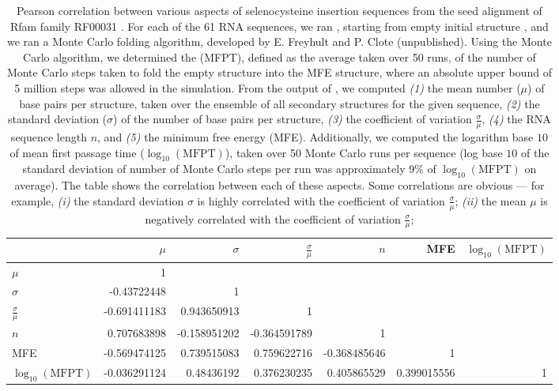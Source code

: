 \begin{landscape}
\begin{table}[!h]
\centering
\begin{tabular}{|l|rrrrrr|}
\hline
~ &$\mu$ &$\sigma$& $\frac{\sigma}{\mu}$& $n$ & MFE & $\log_{10}(\text{MFPT})$\\
\hline
$\mu$& 1 & & & & &\\
$\sigma$&-0.43722448& 1  & & & & \\
$\frac{\sigma}{\mu}$&-0.691411183&0.943650913&1 & & &\\
$n$&0.707683898&-0.158951202&-0.364591789&1& & \\
MFE&-0.569474125&0.739515083&0.759622716&-0.368485646&1 & \\
$\log_{10}(\text{MFPT})$&-0.036291124&0.48436192&0.376230235&0.405865529&0.399015556& 1 \\
\hline
\end{tabular}
\caption{Pearson correlation between various aspects of selenocysteine
insertion sequences from the seed alignment of Rfam family
RF00031 \cite{Gardner.nar11}.
For each of the 61 RNA sequences, we ran \fftbor, starting
from empty initial structure \strSt, and we ran a Monte Carlo
folding algorithm, developed by E. Freyhult and P. Clote (unpublished).
Using the Monte Carlo algorithm, we
determined the \mfpt (MFPT), defined as the average
taken over 50 runs, of the number of Monte Carlo steps taken to fold
the empty structure into the MFE structure, where an absolute upper bound
of 5 million steps was allowed in the simulation.  From the output of
\fftbor, we computed
{\em (1)}
the mean number ($\mu$) of base pairs per structure, taken over
the ensemble of all secondary structures for the given sequence,
{\em (2)}
the standard deviation ($\sigma$) of the number of base pairs per structure,
{\em (3)}
the coefficient of variation $\frac{\sigma}{\mu}$,
{\em (4)}
the RNA sequence length $n$,
and
{\em (5)}
the minimum free energy (MFE).  Additionally, we computed the
logarithm base $10$ of mean first passage
time ($\log_{10}(\text{MFPT})$), taken over 50 Monte Carlo runs per sequence
(log base $10$ of the standard deviation of number of Monte Carlo
steps per run was approximately
9\% of $\log_{10}(\text{MFPT})$ on average). The table shows the correlation between each of
these aspects.
Some correlations are obvious ---
for example,
{\em (i)}
the standard deviation $\sigma$ is highly correlated with the
coefficient of variation $\frac{\sigma}{\mu}$;
{\em (ii)}
the mean $\mu$ is negatively correlated with the
coefficient of variation $\frac{\sigma}{\mu}$;
}
\end{table}
\end{landscape}
